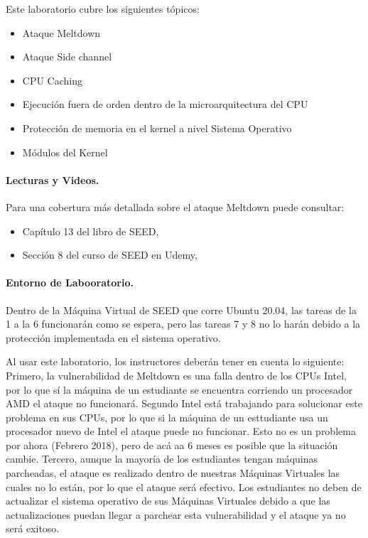 Este laboratorio cubre los siguientes tópicos:

\begin{itemize}[noitemsep]
\item Ataque Meltdown 
\item Ataque Side channel 
\item CPU Caching
\item Ejecución fuera de orden dentro de la microarquitectura del CPU
\item Protección de memoria en el kernel a nivel Sistema Operativo
\item Módulos del Kernel
\end{itemize} 


\paragraph{Lecturas y Videos.}
Para una cobertura más detallada sobre el ataque Meltdown puede consultar:

\begin{itemize}
\item Capítulo 13 del libro de SEED, \seedbook
\item Sección 8 del curso de SEED en Udemy, \seedcsvideo
\end{itemize}



\paragraph{Entorno de Labooratorio.} \seedenvironment Dentro de la Máquina Virtual de SEED que corre Ubuntu 20.04, las tareas de la 1 a la 6 funcionarán como se espera, pero las tareas 7 y 8 no lo harán debido a la protección implementada en el sistema operativo.

Al usar este laboratorio, los instructores deberán tener en cuenta lo siguiente:
Primero, la vulnerabilidad de Meltdown es una falla dentro de los CPUs Intel, por lo que sí la máquina de un estudiante se encuentra corriendo un procesador AMD el ataque no funcionará. 
Segundo Intel está trabajando para solucionar este problema en sus CPUs, por lo que si la máquina de un esttudiante usa un procesador nuevo de Intel el ataque puede no funcionar. Esto no es un problema por ahora (Febrero 2018), pero de acá aa 6 meses es posible que la situación cambie.
Tercero, aunque la mayoría de los estudiantes tengan máquinas parcheadas, el ataque es realizado dentro de nuestras Máquinas Virtuales las cuales no lo están, por lo que el ataque será efectivo.
Los estudiantes no deben de actualizar el sistema operativo de sus Máquinas Virtuales debido a que las actualizaciones puedan llegar a parchear esta vulnerabilidad y el ataque ya no será exitoso.


